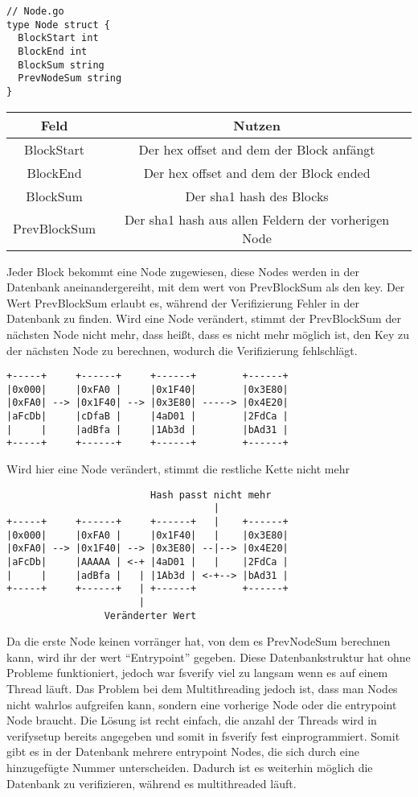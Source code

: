 \begin{verbatim}
// Node.go
type Node struct {
  BlockStart int
  BlockEnd int
  BlockSum string
  PrevNodeSum string
}
\end{verbatim}

\begin{center}
  \begin{tabular}{|c | c|}
    \hline
    Feld & Nutzen \\ [0.5ex]
    \hline
    BlockStart & Der hex offset and dem der Block anfängt \\
    \hline
    BlockEnd & Der hex offset and dem der Block ended \\
    \hline
    BlockSum & Der sha1 hash des Blocks \\
    \hline
    PrevBlockSum & Der sha1 hash aus allen Feldern der vorherigen Node \\
    \hline
  \end{tabular}
\end{center}
Jeder Block bekommt eine Node zugewiesen, diese Nodes werden in der Datenbank aneinandergereiht, mit dem wert von PrevBlockSum als den key.
Der Wert PrevBlockSum erlaubt es, während der Verifizierung Fehler in der Datenbank zu finden. Wird eine Node verändert, stimmt der PrevBlockSum der nächsten Node nicht mehr, dass heißt, dass es nicht mehr möglich ist, den Key zu der nächsten Node zu berechnen, wodurch die Verifizierung fehlschlägt.
\pagebreak
\begin{verbatim}
+-----+     +------+     +------+        +------+
|0x000|     |0xFA0 |     |0x1F40|        |0x3E80|
|0xFA0| --> |0x1F40| --> |0x3E80| -----> |0x4E20|
|aFcDb|     |cDfaB |     |4aD01 |        |2FdCa |
|     |     |adBfa |     |1Ab3d |        |bAd31 |
+-----+     +------+     +------+        +------+
\end{verbatim}
Wird hier eine Node verändert, stimmt die restliche Kette nicht mehr
\begin{verbatim}
                         Hash passt nicht mehr
                                    |
+-----+     +------+     +------+   |    +------+
|0x000|     |0xFA0 |     |0x1F40|   |    |0x3E80|
|0xFA0| --> |0x1F40| --> |0x3E80| --|--> |0x4E20|
|aFcDb|     |AAAAA | <-+ |4aD01 |   |    |2FdCa |
|     |     |adBfa |   | |1Ab3d | <-+--> |bAd31 |
+-----+     +------+   | +------+        +------+
                       |
                 Veränderter Wert
\end{verbatim}
Da die erste Node keinen vorränger hat, von dem es PrevNodeSum berechnen kann, wird ihr der wert ``Entrypoint'' gegeben.
\bigbreak \noindent
Diese Datenbankstruktur hat ohne Probleme funktioniert, jedoch war fsverify viel zu langsam wenn es auf einem Thread läuft. Das Problem bei dem Multithreading jedoch ist, dass man Nodes nicht wahrlos aufgreifen kann, sondern eine vorherige Node oder die entrypoint Node braucht. Die Lösung ist recht einfach, die anzahl der Threads wird in verifysetup bereits angegeben und somit in fsverify fest einprogrammiert. Somit gibt es in der Datenbank mehrere entrypoint Nodes, die sich durch eine hinzugefügte Nummer unterscheiden. Dadurch ist es weiterhin möglich die Datenbank zu verifizieren, während es multithreaded läuft.

